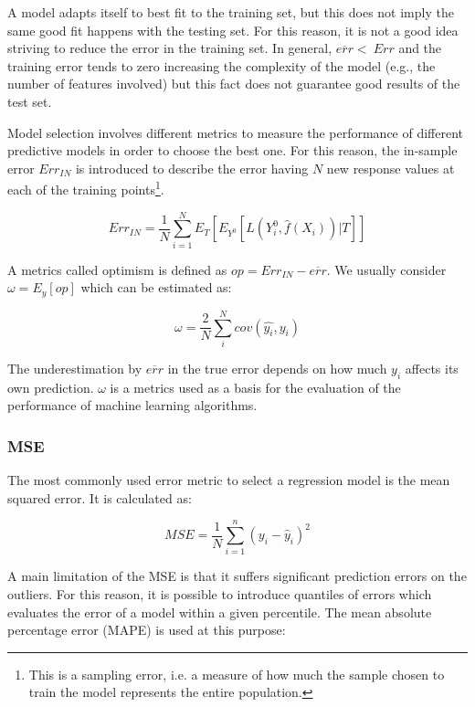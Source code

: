 A model adapts itself to best fit to the training set, but this does not imply the same good fit happens with the testing set. For this reason, it is not a good idea striving to reduce the error in the training set. In general, $\overline{err}<\ Err$ and the training error tends to zero increasing the complexity of the model (e.g., the number of features involved) but this fact does not guarantee good results of the test set.\par

Model selection involves different metrics to measure the performance of different predictive models in order to choose the best one. For this reason, the in-sample error $Err_{IN}$ is introduced to describe the error having $N$ new response values at each of the training points\footnote{This is a sampling error, i.e. a measure of how much the sample chosen to train the model represents the entire population.}.

\begin{equation}
Err_{IN}= \frac{1}{N}\sum_{i=1}^{N}E_{T}\left[E_{Y^0}\left[L\left(Y_i^0,\hat{f}(X_i)\right)|T\right]\right]
\label{eq_trainTestError3}
\end{equation}

A metrics called optimism is defined as $op=Err_{IN}-\overline{err}$. We usually consider $\omega=E_y[op]$ which can be estimated as:

\begin{equation}
\omega=\frac{2}{N}\sum_{i}^{N}{cov(\widehat{y_i},y_i)}
\label{eq_trainTestError4}
\end{equation}

The underestimation by $\overline{err}$ in the true error depends on how much $y_i$ affects its own prediction. $\omega$ is a metrics used as a basis for the evaluation of the performance of machine learning algorithms.

\subsubsection{MSE} \label{secMSE}
The most commonly used error metric to select a regression model is the mean squared error. It is calculated as:

\begin{equation}
MSE=\frac{1}{N}\sum_{i=1}^{n}\left(y_i-{\hat{y}}_i\right)^2
\label{eq_MSE}
\end{equation}

A main limitation of the MSE is that it suffers significant prediction errors on the outliers. For this reason, it is possible to introduce quantiles of errors which evaluates the error of a model within a given percentile. The mean absolute percentage error (MAPE) is used at this purpose:

